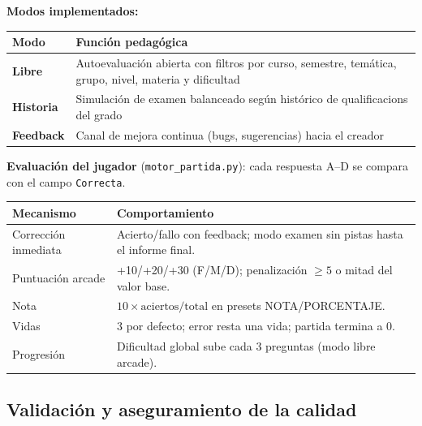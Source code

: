 \documentclass[11pt,a4paper]{article}
\newcommand{\bloquetfg}[1]{\par\smallskip\noindent #1\par}
\newcommand{\iniciotabla}{\par\medskip\renewcommand{\arraystretch}{1.12}}
\newcommand{\fintabla}{\par\medskip}
\begin{document}
\bloquetfg{\textbf{Modos implementados:}}
\iniciotabla
\begin{tabular}{@{}lp{9cm}@{}}
\toprule
\textbf{Modo} & \textbf{Función pedagógica} \\
\midrule
\textbf{Libre} & Autoevaluación abierta con filtros por curso, semestre, temática, grupo, nivel, materia y dificultad \\
\textbf{Historia} & Simulación de examen balanceado según histórico de qualificacions del grado \\
\textbf{Feedback} & Canal de mejora continua (bugs, sugerencias) hacia el creador \\
\bottomrule
\end{tabular}
\fintabla

\bloquetfg{\textbf{Evaluación del jugador} (\texttt{motor\_partida.py}): cada respuesta A--D se compara con el campo \texttt{Correcta}.}
\iniciotabla
\begin{tabular}{@{}lp{9.5cm}@{}}
\toprule
\textbf{Mecanismo} & \textbf{Comportamiento} \\
\midrule
Corrección inmediata & Acierto/fallo con feedback; modo examen sin pistas hasta el informe final. \\
Puntuación arcade & +10/+20/+30 (F/M/D); penalización $\geq 5$ o mitad del valor base. \\
Nota & $10 \times \text{aciertos}/\text{total}$ en presets NOTA/PORCENTAJE. \\
Vidas & 3 por defecto; error resta una vida; partida termina a 0. \\
Progresión & Dificultad global sube cada 3 preguntas (modo libre arcade). \\
\bottomrule
\end{tabular}
\fintabla

\subsection{Validación y aseguramiento de la calidad}
\end{document}

